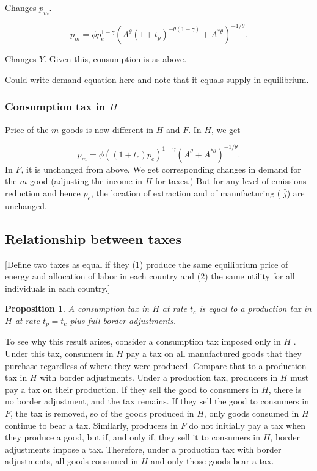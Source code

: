 \documentclass[notitlepage,12pt]{article}
\newtheorem{proposition}[theorem]{Proposition}
\begin{document}
Changes $p_{m}$.

\begin{equation*}
p_{m}=\phi p_{e}^{1-\gamma }\left( A^{\theta }\left( 1+t_{p}\right)
^{-\theta \left( 1-\gamma \right) }+A^{\ast \theta }\right) ^{-1/\theta }.
\end{equation*}

Changes $Y$. Given this, consumption is as above.

Could write demand equation here and note that it equals supply in
equilibrium.

\subsubsection{Consumption tax in $H$}

Price of the $m$-goods is now different in $H$ and $F$. In $H$, we get

\begin{equation*}
p_{m}=\phi \left( \left( 1+t_{c}\right) p_{e}\right) ^{1-\gamma }\left(
A^{\theta }+A^{\ast \theta }\right) ^{-1/\theta }.
\end{equation*}%
In $F$, it is unchanged from above. We get corresponding changes in demand
for the $m$-good (adjusting the income in $H$ for taxes.) But for any level
of emissions reduction and hence $p_{e}$, the location of extraction and of
manufacturing ( $\bar{j}$) are unchanged.

\subsection{Relationship between taxes}

[Define two taxes as equal if they (1) produce the same equilibrium price of
energy and allocation of labor in each country and (2) the same utility for
all individuals in each country.]

\begin{proposition}
A consumption tax in $H$ at rate $t_{c}$ is equal to a production tax in $H$
at rate $t_{p}=t_{c}$ plus full border adjustments.
\end{proposition}

To see why this result arises, consider a consumption tax imposed only in $H$%
. Under this tax, consumers in $H$ pay a tax on all manufactured goods that
they purchase regardless of where they were produced. Compare that to a
production tax in $H$ with border adjustments. Under a production tax,
producers in $H$ must pay a tax on their production. If they sell the good
to consumers in $H$, there is no border adjustment, and the tax remains. If
they sell the good to consumers in $F$, the tax is removed, so of the goods
produced in $H$, only goods consumed in $H$ continue to bear a tax.
Similarly, producers in $F$ do not initially pay a tax when they produce a
good, but if, and only if, they sell it to consumers in $H$, border
adjustments impose a tax. Therefore, under a production tax with border
adjustments, all goods consumed in $H$ and only those goods bear a tax.
\end{document}
